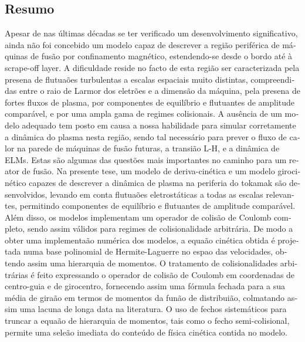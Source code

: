 \begin{otherlanguage}{portuguese}
\cleardoublepage
\chapter*{Resumo}

\hspace{-1cm}

Apesar de nas últimas décadas se ter verificado um desenvolvimento significativo, ainda não foi concebido um modelo capaz de descrever a região periférica de máquinas de fusão por confinamento magnético, estendendo-se desde o bordo até à scrape-off layer.
%
A dificuldade reside no facto de esta região ser caracterizada pela presen{}a de flutua{}ões turbulentas a escalas espaciais muito distintas, compreendidas entre o raio de Larmor dos eletrões e a dimensão da máquina, pela presen{}a de fortes fluxos de plasma, por componentes de equilíbrio e flutuantes de amplitude comparável, e por uma ampla gama de regimes colisionais.
%
A ausência de um modelo adequado tem posto em causa a nossa habilidade para simular corretamente a dinâmica do plasma nesta região, sendo tal necessário para prever o fluxo de calor na parede de máquinas de fusão futuras, a transi{}ão L-H, e a dinâmica de ELMs.
%
Estas são algumas das questões mais importantes no caminho para um reator de fusão.
%
Na presente tese, um modelo de deriva-cinética e um modelo girocinético capazes de descrever a dinâmica de plasma na periferia do tokamak são desenvolvidos, levando em conta flutua{}ões eletrostáticas a todas as escalas relevantes, permitindo componentes de equilíbrio e flutuantes de amplitude comparável.
%
Além disso, os modelos implementam um operador de colisão de Coulomb completo, sendo assim válidos para regimes de colisionalidade arbitrária.
%
De modo a obter uma implementa{}ão numérica dos modelos, a equa{}ão cinética obtida é projetada numa base polinomial de Hermite-Laguerre no espa{}o das velocidades, obtendo assim uma hierarquia de momentos.
%
O tratamento de colisionalidades arbitrárias é feito expressando o operador de colisão de Coulomb em coordenadas de centro-guia e de girocentro, fornecendo assim uma fórmula fechada para a sua média de gira{}ão em termos de momentos da fun{}ão de distribui{}ão, colmatando assim uma lacuna de longa data na literatura.
%
O uso de fechos sistemáticos para truncar a equa{}ão de hierarquia de momentos, tais como o fecho semi-colisional, permite uma sele{}ão imediata do conteúdo de física cinética contida no modelo.

\end{otherlanguage}
